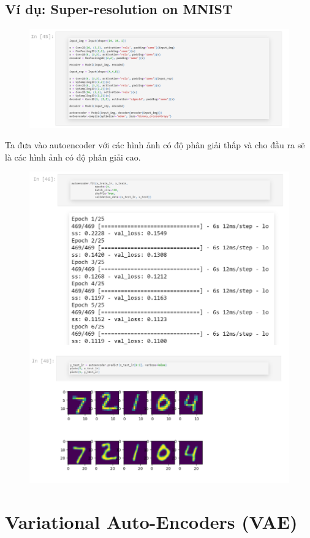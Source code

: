 \documentclass{book}
\begin{document}
\subsection{Ví dụ: Super-resolution on MNIST}

\begin{figure}[H]
	\centering
	\includegraphics[width=0.75\linewidth]{images/au18.png}
\end{figure}
Ta đưa vào autoencoder với các hình ảnh có độ phân giải thấp và cho đầu ra sẽ là các hình ảnh có độ phân giải cao.
\begin{figure}[H]
	\centering
	\includegraphics[width=0.75\linewidth]{images/au19.png}
\end{figure}

\section{Variational Auto-Encoders (VAE)}
\end{document}
